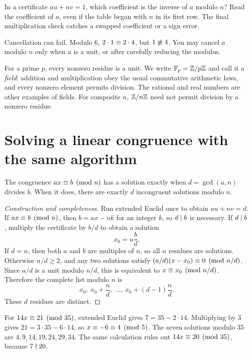 \begin{checkpoint}
In a certificate $au+nv=1$, which coefficient is the inverse of $a$
modulo $n$? Read the coefficient of $a$, even if the table began with
$n$ in its first row. The final multiplication check catches a swapped
coefficient or a sign error.
\end{checkpoint}

\begin{warningbox}
Cancellation can fail. Modulo $6$, $2\cdot1\equiv2\cdot4$, but $1\not\equiv4$. You may cancel $a$ modulo $n$ only when $a$ is a unit, or after carefully reducing the modulus.
\end{warningbox}

For a prime $p$, every nonzero residue is a unit. We write
$\mathbb F_p=\mathbb Z/p\mathbb Z$ and call it a \emph{field}: addition and multiplication obey
the usual commutative arithmetic laws, and every nonzero element permits
division. The rational and real numbers are other examples of fields.
For composite $n$, $\mathbb Z/n\mathbb Z$ need not permit division by a nonzero residue.

\section{Solving a linear congruence with the same algorithm}

\begin{proposition}
The congruence $ax\equiv b\pmod n$ has a solution exactly when $d=\gcd(a,n)$ divides $b$. When it does, there are exactly $d$ incongruent solutions modulo $n$.
\end{proposition}

\begin{proof}[Construction and completeness]
Run extended Euclid once to obtain $au+nv=d$. If $ax\equiv b\pmod n$,
then $b=ax-nk$ for an integer $k$, so $d\mid b$ is necessary.
If $d\mid b$, multiply the certificate by $b/d$ to obtain a solution
\[
 x_0=u\frac bd.
\]
If $d=n$, then both $a$ and $b$ are multiples of $n$, so all $n$ residues
are solutions. Otherwise $n/d\ge2$, and any two solutions satisfy
$(a/d)(x-x_0)\equiv0\pmod{n/d}$. Since $a/d$ is a unit modulo $n/d$,
this is equivalent to $x\equiv x_0\pmod{n/d}$. Therefore the complete list
modulo $n$ is
\[
 x_0,\ x_0+\frac nd,\ \ldots,\ x_0+(d-1)\frac nd.
\]
These $d$ residues are distinct.
\end{proof}

\begin{example}
For $14x\equiv21\pmod{35}$, extended Euclid gives
$7=35-2\cdot14$. Multiplying by $3$ gives $21=3\cdot35-6\cdot14$,
so $x\equiv-6\equiv4\pmod5$. The seven solutions modulo $35$ are
$4,9,14,19,24,29,34$. The same calculation rules out
$14x\equiv20\pmod{35}$, because $7\nmid20$.
\end{example}

